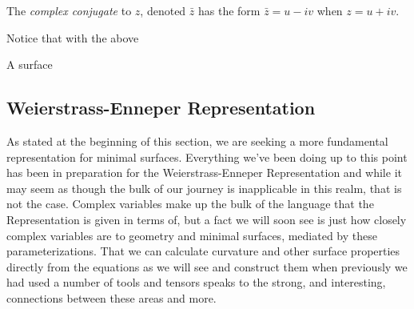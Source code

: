   \begin{defn}
    The \emph{complex conjugate} to $z$, denoted $\bar{z}$ has the form $\bar{z} = u - i v$ when $z = u + iv$.
  \end{defn}

  \begin{unno_rem}
    Notice that with the above 
  \end{unno_rem}









  

  \begin{defn}
    A surface 
  \end{defn}

\subsection{Weierstrass-Enneper Representation}
  As stated at the beginning of this section, we are seeking a more fundamental representation for minimal surfaces. Everything we've been doing up to this point has been in preparation for the Weierstrass-Enneper Representation and while it may seem as though the bulk of our journey is inapplicable in this realm, that is not the case. Complex variables make up the bulk of the language that the Representation is given in terms of, but a fact we will soon see is just how closely complex variables are to geometry and minimal surfaces, mediated by these parameterizations. That we can calculate curvature and other surface properties directly from the equations as we will see and construct them when previously we had used a number of tools and tensors speaks to the strong, and interesting, connections between these areas and more.

